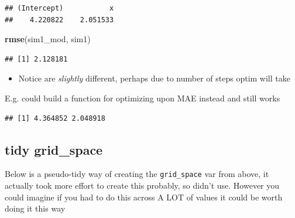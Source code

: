 \documentclass[]{book}
\newenvironment{Shaded}{\begin{snugshade}}{\end{snugshade}}
\newcommand{\ControlFlowTok}[1]{\textcolor[rgb]{0.13,0.29,0.53}{\textbf{#1}}}
\newcommand{\DataTypeTok}[1]{\textcolor[rgb]{0.13,0.29,0.53}{#1}}
\newcommand{\DecValTok}[1]{\textcolor[rgb]{0.00,0.00,0.81}{#1}}
\newcommand{\KeywordTok}[1]{\textcolor[rgb]{0.13,0.29,0.53}{\textbf{#1}}}
\newcommand{\NormalTok}[1]{#1}
\newcommand{\OperatorTok}[1]{\textcolor[rgb]{0.81,0.36,0.00}{\textbf{#1}}}
\newcommand{\StringTok}[1]{\textcolor[rgb]{0.31,0.60,0.02}{#1}}
\providecommand{\tightlist}{%
  \setlength{\itemsep}{0pt}\setlength{\parskip}{0pt}}
\theoremstyle{definition}
\theoremstyle{definition}
\theoremstyle{definition}
\theoremstyle{remark}
\begin{document}
\begin{verbatim}
## (Intercept)           x 
##    4.220822    2.051533
\end{verbatim}

\begin{Shaded}
\begin{Highlighting}[]
\KeywordTok{rmse}\NormalTok{(sim1_mod, sim1)}
\end{Highlighting}
\end{Shaded}

\begin{verbatim}
## [1] 2.128181
\end{verbatim}

\begin{itemize}
\tightlist
\item
  Notice are \emph{slightly} different, perhaps due to number of steps
  optim will take
\end{itemize}

E.g. could build a function for optimizing upon MAE instead and still
works

\begin{Shaded}
\end{Shaded}

\begin{verbatim}
## [1] 4.364852 2.048918
\end{verbatim}

\hypertarget{tidy-grid_space}{%
\subsection{tidy grid\_space}\label{tidy-grid_space}}

Below is a pseudo-tidy way of creating the \texttt{grid\_space} var from
above, it actually took more effort to create this probably, so didn't
use. However you could imagine if you had to do this across A LOT of
values it could be worth doing it this way
\end{document}
